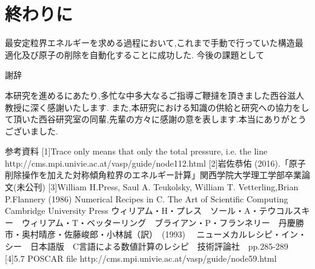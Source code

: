 \chapter{終わりに}\label{ux7d42ux308fux308aux306b}

最安定粒界エネルギーを求める過程において,これまで手動で行っていた構造最適化及び原子の削除を自動化することに成功した.
今後の課題として

    謝辞

本研究を進めるにあたり,多忙な中多大なるご指導ご鞭撻を頂きました西谷滋人教授に深く感謝いたします.
また,本研究における知識の供給と研究への協力をして頂いた西谷研究室の同輩,先輩の方々に感謝の意を表します.本当にありがとうございました.

    参考資料 {[}1{]}Trace only means that only the total pressure, i.e. the
line http://cms.mpi.univie.ac.at/vasp/guide/node112.html {[}2{]}岩佐恭佑
(2016).「原子削除操作を加えた対称傾角粒界のエネルギー計算」関西学院大学理工学部卒業論文(未公刊)
{[}3{]}William H.Press, Saul A. Teukolsky, William T. Vetterling,Brian
P.Flannery (1986) Numerical Recipes in C. The Art of Scientific
Computing Cambridge University Press
ウィリアム・H・プレス　ソール・A・テウコルスキー　ウィリアム・T・ベッターリング　ブライアン・P・フランネリー　丹慶勝市・奥村晴彦・佐藤峻郎・小林誠（訳）　(1993)　
ニューメカルレシピ・イン・シー　日本語版　C言語による数値計算のレシピ　技術評論社　pp.285-289
{[}4{]}5.7 POSCAR file
http://cms.mpi.univie.ac.at/vasp/guide/node59.html


    
    
    
    
